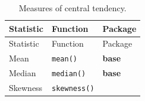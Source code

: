 \documentclass[english,10pt,a4paper,oneside]{book}
\theoremstyle{definition}
\theoremstyle{definition}
\theoremstyle{definition}
\theoremstyle{remark}
\begin{document}
\begin{longtable}[]{@{}lll@{}}
\caption{Measures of central tendency.}\tabularnewline
\toprule
\begin{minipage}[b]{0.25\columnwidth}\raggedright\strut
Statistic\strut
\end{minipage} & \begin{minipage}[b]{0.18\columnwidth}\raggedright\strut
Function\strut
\end{minipage} & \begin{minipage}[b]{0.18\columnwidth}\raggedright\strut
Package\strut
\end{minipage}\tabularnewline
\midrule
\endfirsthead
\toprule
\begin{minipage}[b]{0.25\columnwidth}\raggedright\strut
Statistic\strut
\end{minipage} & \begin{minipage}[b]{0.18\columnwidth}\raggedright\strut
Function\strut
\end{minipage} & \begin{minipage}[b]{0.18\columnwidth}\raggedright\strut
Package\strut
\end{minipage}\tabularnewline
\midrule
\endhead
\begin{minipage}[t]{0.25\columnwidth}\raggedright\strut
Mean\strut
\end{minipage} & \begin{minipage}[t]{0.18\columnwidth}\raggedright\strut
\texttt{mean()}\strut
\end{minipage} & \begin{minipage}[t]{0.18\columnwidth}\raggedright\strut
\textbf{base}\strut
\end{minipage}\tabularnewline
\begin{minipage}[t]{0.25\columnwidth}\raggedright\strut
Median\strut
\end{minipage} & \begin{minipage}[t]{0.18\columnwidth}\raggedright\strut
\texttt{median()}\strut
\end{minipage} & \begin{minipage}[t]{0.18\columnwidth}\raggedright\strut
\textbf{base}\strut
\end{minipage}\tabularnewline
\begin{minipage}[t]{0.25\columnwidth}\raggedright\strut
Skewness\strut
\end{minipage} & \begin{minipage}[t]{0.18\columnwidth}\raggedright\strut
\texttt{skewness()}\strut
\end{minipage} & \begin{minipage}[t]{0.18\columnwidth}\raggedright\strut

\end{minipage}
\end{longtable}
\end{document}

